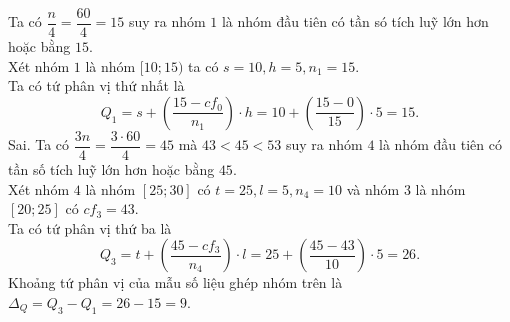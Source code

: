 \begin{ex}
{\begin{itemchoice}
			Ta có $\dfrac{n}{4}=\dfrac{60}{4}=15$ suy ra nhóm $1$ là nhóm đầu tiên có tần só tích luỹ lớn hơn hoặc bằng $15$.\\
			Xét nhóm $1$ là nhóm $[10 ; 15)$ ta có $s=10, h=5, n_1=15$.\\			
			Ta có tứ phân vị thứ nhất là $$Q_1=s+\left(\dfrac{15-c f_0}{n_1}\right) \cdot h=10+\left(\dfrac{15-0}{15}\right) \cdot 5=15.$$
			\itemch Sai. Ta có $\dfrac{3 n}{4}=\dfrac{3\cdot60}{4}=45$ mà $43<45<53$ suy ra nhóm $4$ là nhóm đầu tiên có tần số tích luỹ lớn hơn hoặc bằng $45$.\\
			Xét nhóm $4$ là nhóm $[25;30]$ có $t=25, l=5, n_4=10$ và nhóm $3$ là nhóm $[20;25]$ có $c f_3=43$.\\
			Ta có tứ phân vị thứ ba là $$Q_3=t+\left(\dfrac{45-c f_3}{n_4}\right) \cdot l=25+\left(\dfrac{45-43}{10}\right) \cdot 5=26.$$
			Khoảng tứ phân vị của mẫu số liệu ghép nhóm trên là $\Delta_Q=Q_3-Q_1=26-15=9$.
		\end{itemchoice}
	}
\end{ex}

